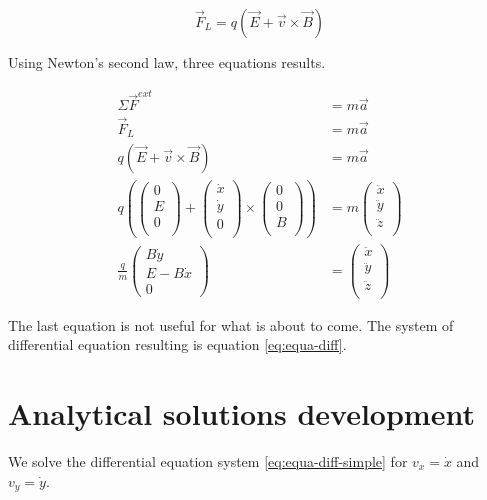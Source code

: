 \documentclass[a4paper,12pt,twoside]{article}
\begin{document}
\begin{equation*}
	\vec{F}_L = q(\vec{E} + \vec{v}\times\vec{B})
	\label{eq:lorentz-force}
\end{equation*}

Using Newton's second law, three equations results.

\begin{align*}
	\Sigma\vec{F}^{ext} &= m\vec{a} \\
	\vec{F}_L &= m\vec{a}\\
	q(\vec{E} + \vec{v}\times\vec{B}) &= m\vec{a} \\
	q\left( \begin{pmatrix} 0\\ E\\ 0\\ \end{pmatrix} + \begin{pmatrix} \dot{x}\\ \dot{y}\\ 0\\ \end{pmatrix} \times \begin{pmatrix} 0\\ 0\\ B\\ \end{pmatrix}\right) &= m\begin{pmatrix} \ddot{x}\\ \ddot{y}\\ \ddot{z}\\ \end{pmatrix} \\
	\frac{q}{m}\begin{pmatrix} B\dot{y}\\ E - B\dot{x}\\ 0 \end{pmatrix} &= \begin{pmatrix} \ddot{x}\\ \ddot{y}\\ \ddot{z}\\ \end{pmatrix}
\end{align*}

The last equation is not useful for what is about to come.
The system of differential equation resulting is equation \ref{eq:equa-diff}.

\section{Analytical solutions development} \label{ann:dev-sol-ana}
We solve the differential equation system \ref{eq:equa-diff-simple} for $v_x = \dot{x}$ and $v_y = \dot{y}$.
\end{document}
